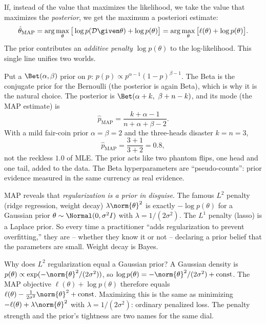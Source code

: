 If, instead of the value that maximizes the likelihood, we take the value that
maximizes the \emph{posterior}, we get the maximum a posteriori estimate:
\[
  \hat\theta_{\text{MAP}}
  = \arg\max_\theta \big[\log p(\mathcal{D}\given\theta) + \log p(\theta)\big]
  = \arg\max_\theta \big[\ell(\theta) + \log p(\theta)\big].
\]
The prior contributes an \emph{additive penalty} $\log p(\theta)$ to the
log-likelihood. This single line unifies two worlds.

\begin{example}
\label{ch34:coin-map}
Put a $\Bet(\alpha,\beta)$ prior on $p$: $p(p)\propto p^{\alpha-1}(1-p)^{\beta-1}$.
The Beta is the conjugate prior for the Bernoulli (the posterior is again Beta),
which is why it is the natural choice. The posterior is
$\Bet(\alpha+k,\ \beta+n-k)$, and its mode (the MAP estimate) is
\[
  \hat p_{\text{MAP}} = \frac{k + \alpha - 1}{n + \alpha + \beta - 2}.
\]
With a mild fair-coin prior $\alpha=\beta=2$ and the three-heads disaster
$k=n=3$,
\[
  \hat p_{\text{MAP}} = \frac{3 + 1}{3 + 2} = 0.8,
\]
not the reckless $1.0$ of MLE. The prior acts like two phantom flips, one head and
one tail, added to the data. The Beta hyperparameters are ``pseudo-counts'': prior
evidence measured in the same currency as real evidence.
\end{example}

\begin{aestheticbox}
MAP reveals that \emph{regularization is a prior in disguise}. The famous
$L^2$ penalty (ridge regression, weight decay) $\lambda\norm{\theta}^2$ is
exactly $-\log p(\theta)$ for a Gaussian prior
$\theta\sim\Normal(0,\sigma^2 I)$ with $\lambda = 1/(2\sigma^2)$. The $L^1$
penalty (lasso) is a Laplace prior. So every time a practitioner ``adds
regularization to prevent overfitting,'' they are -- whether they know it or
not -- declaring a prior belief that the parameters are small. Weight decay is
Bayes.
\end{aestheticbox}

\begin{whybox}
Why does $L^2$ regularization equal a Gaussian prior? A Gaussian density is
$p(\theta)\propto \exp(-\norm{\theta}^2/(2\sigma^2))$, so
$\log p(\theta) = -\norm{\theta}^2/(2\sigma^2) + \text{const}$. The MAP objective
$\ell(\theta) + \log p(\theta)$ therefore equals
$\ell(\theta) - \tfrac{1}{2\sigma^2}\norm{\theta}^2 + \text{const}$. Maximizing
this is the same as minimizing $-\ell(\theta) + \lambda\norm{\theta}^2$ with
$\lambda=1/(2\sigma^2)$: ordinary penalized loss. The penalty strength and the
prior's tightness are two names for the same dial.
\end{whybox}

